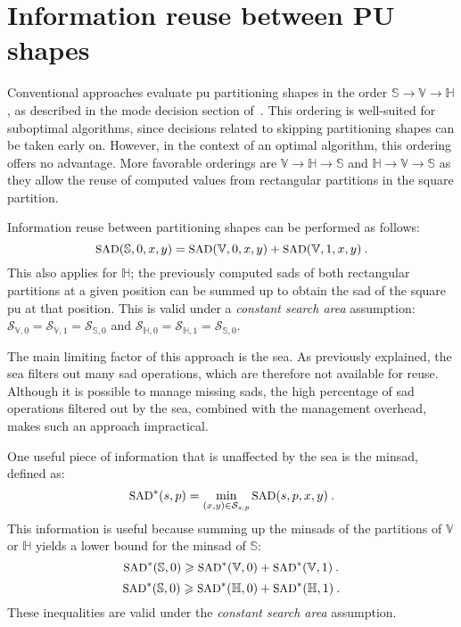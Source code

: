 \documentclass{article}
\newcommand{\minsad}{
    \text{SAD}^*
}
\begin{document}
\section{Information reuse between PU shapes}
\label{sec:InfoReuse}
\vspace{-0.5em}

Conventional approaches evaluate \gls{pu} partitioning shapes in the order $\mathbb{S} \rightarrow \mathbb{V} \rightarrow \mathbb{H}$, as described in the mode decision section of~\cite{McCann2014}. This ordering is well-suited for suboptimal algorithms, since decisions related to skipping partitioning shapes can be taken early on. However, in the context of an optimal algorithm, this ordering offers no advantage. More favorable orderings are $\mathbb{V} \rightarrow \mathbb{H} \rightarrow \mathbb{S}$ and $\mathbb{H} \rightarrow \mathbb{V} \rightarrow \mathbb{S}$ as they allow the reuse of computed values from rectangular partitions in the square partition.

Information reuse between partitioning shapes can be performed as follows:
\begin{equation}
\small{
 \text{SAD}(\mathbb{S},0,x,y) = \text{SAD}(\mathbb{V},0,x,y) + \text{SAD}(\mathbb{V},1,x,y)\:.
}
\end{equation}
This also applies for $\mathbb{H}$; the previously computed \glspl{sad} of both rectangular partitions at a given position can be summed up to obtain the \gls{sad} of the square \gls{pu} at that position. This is valid under a \textit{constant search area} assumption:  $\mathcal{S}_{\mathbb{V},0} = \mathcal{S}_{\mathbb{V},1} = \mathcal{S}_{\mathbb{S},0}$ and $\mathcal{S}_{\mathbb{H},0} = \mathcal{S}_{\mathbb{H},1} = \mathcal{S}_{\mathbb{S},0}$.

The main limiting factor of this approach is the \gls{sea}. As previously explained, the \gls{sea} filters out many \gls{sad} operations, which are therefore not available for reuse. Although it is possible to manage missing \glspl{sad}, the high percentage of \gls{sad} operations filtered out by the \gls{sea}, combined with the management overhead, makes such an approach impractical. 

One useful piece of information that is unaffected by the \gls{sea} is the \gls{minsad}, defined as:
\begin{equation}
\small{
\minsad(s,p) = \min_{(x,y) \in \mathcal{S}_{s,p}} \text{SAD}(s,p,x,y) \:.
}
\end{equation}
This information is useful because summing up the \glspl{minsad} of the partitions of $\mathbb{V}$ or $\mathbb{H}$ yields a lower bound for the \gls{minsad} of $\mathbb{S}$:
\begin{equation}
\small{
\minsad(\mathbb{S},0) \geqslant \minsad(\mathbb{V},0) + \minsad(\mathbb{V},1)\:.
}
\label{eq:MinV}
\end{equation}
\begin{equation}
\small{
\minsad(\mathbb{S},0) \geqslant \minsad(\mathbb{H},0) + \minsad(\mathbb{H},1)\:.
}
\label{eq:MinH}
\end{equation}
These inequalities are valid under the \textit{constant search area} assumption.
\end{document}
